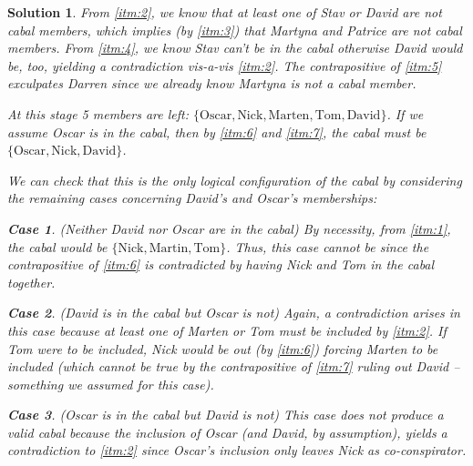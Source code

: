 \documentclass[a4paper]{article}
\newtheorem*{solution}{Solution}
\newtheorem{case}{Case}
\begin{document}
\begin{solution}

From \ref{itm:2}, we know that at least one of Stav or David are \textit{not}
cabal members, which implies (by \ref{itm:3}) that Martyna and Patrice are not
cabal members. From \ref{itm:4}, we know Stav can't be in the cabal otherwise
David would be, too, yielding a contradiction vis-a-vis \ref{itm:2}. The
contrapositive of \ref{itm:5} exculpates Darren since we already know Martyna
is not a cabal member.

At this stage 5 members are left: $\lbrace \text{Oscar}, \text{Nick},
\text{Marten}, \text{Tom}, \text{David} \rbrace$. If we assume Oscar is in the
cabal, then by \ref{itm:6} and \ref{itm:7}, the cabal must be $\lbrace
\text{Oscar}, \text{Nick}, \text{David} \rbrace$.

We can check that this is the only logical configuration of the cabal by
considering the remaining cases concerning David's and Oscar's memberships:

\begin{addmargin}[1em]{2em}
	\begin{case}
		(Neither David nor Oscar are in the cabal) By necessity, from \ref{itm:1},
		the cabal would be $\lbrace \text{Nick}, \text{Martin}, \text{Tom} \rbrace$.
		Thus, this case cannot be since the contrapositive of \ref{itm:6} is
		contradicted by having Nick and Tom in the cabal together.
	\end{case}

	\begin{case}
		(David is in the cabal but Oscar is not) Again, a contradiction arises in
		this case because at least one of Marten or Tom must be included by
		\ref{itm:2}. If Tom were to be included, Nick would be out (by \ref{itm:6})
		forcing Marten to be included (which cannot be true by the
		contrapositive of \ref{itm:7} ruling out David -- something we assumed for
		this case).
	\end{case}

	\begin{case}
		(Oscar is in the cabal but David is not) This case does not produce a valid
		cabal because the inclusion of Oscar (and David, by assumption), yields a
		contradiction to \ref{itm:2} since Oscar's inclusion only leaves Nick as
		co-conspirator.
	\end{case}
\end{addmargin}
\end{solution}
\end{document}
